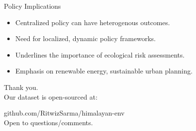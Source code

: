 \documentclass{beamer}
\begin{document}
    \begin{frame}{Policy Implications}
        \begin{itemize}
            \item Centralized policy can have heterogenous outcomes.
            \item Need for localized, dynamic policy frameworks.
            \item Underlines the importance of ecological risk assessments.
            \item Emphasis on renewable energy, sustainable urban planning.
        \end{itemize}
    \end{frame}
    
    \begin{frame}[standout]
        Thank you.\\[2em]
        
        Our dataset is open-sourced at:

        github.com/RitwizSarma/himalayan-env\\[2em]

        Open to questions/comments.
    \end{frame}
    
\end{document}
